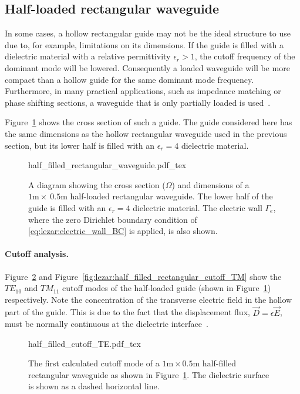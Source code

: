 \subsection{Half-loaded rectangular waveguide}

In some cases, a hollow rectangular guide may not be the ideal structure
to use due to, for example, limitations on its dimensions. If the guide
is filled with a dielectric material with a relative permittivity
$\epsilon_r > 1$, the cutoff frequency of the dominant mode will be
lowered. Consequently a loaded waveguide will be more compact than
a hollow guide for the same dominant mode frequency. Furthermore,
in many practical applications, such as impedance matching or phase
shifting sections, a waveguide that is only partially loaded is
used~\citep{Pozar2005}.

Figure~\ref{fig:lezar:half_filled_rectangular_guide} shows the cross
section of such a guide. The guide considered here has the same dimensions
as the hollow rectangular waveguide used in the previous section, but
its lower half is filled with an $\epsilon_r = 4$ dielectric material.
\begin{figure}
    \centering
    \def\svgwidth{\smallfig}
    {half_filled_rectangular_waveguide.pdf_tex}
    \caption{A diagram showing the cross section ($\Omega$)
    and dimensions of a $1\text{m}\times~0.5\text{m}$ half-loaded
    rectangular waveguide. The lower half of the guide is filled with
    an $\epsilon_r = 4$ dielectric material. The electric
    wall $\Gamma_e$, where the zero Dirichlet boundary condition of
    \eqref{eq:lezar:electric_wall_BC} is applied, is also shown.}
    \label{fig:lezar:half_filled_rectangular_guide}
\end{figure}

\paragraph{Cutoff analysis.}

Figure~\ref{fig:lezar:half_filled_rectangular_cutoff_TE} and
Figure~\ref{fig:lezar:half_filled_rectangular_cutoff_TM} show the
$TE_{10}$ and $TM_{11}$ cutoff modes of the half-loaded guide (shown in
Figure~\ref{fig:lezar:half_filled_rectangular_guide}) respectively. Note
the concentration of the transverse electric field in the hollow part of
the guide. This is due to the fact that the displacement flux, $\vec{D}
= \epsilon\vec{E}$, must be normally continuous at the dielectric
interface~\citep{Pozar2005, Smith1997}.
\begin{figure}
\centering
  \def\svgwidth{\smallfig}
    {half_filled_cutoff_TE.pdf_tex}
\caption{The first calculated cutoff mode of a
$1\text{m}\times0.5\text{m}$ half-filled rectangular waveguide as shown
in Figure~\ref{fig:lezar:half_filled_rectangular_guide}. The dielectric
surface is shown as a dashed horizontal line.}
\label{fig:lezar:half_filled_rectangular_cutoff_TE}
\end{figure}

